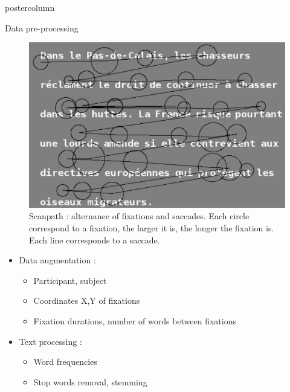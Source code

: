 \documentclass[final,hyperref={pdfpagelabels=false}]{beamer}
\begin{document}
\begin{frame}
\begin{columns}
\begin{column}{.49\textwidth}
\begin{beamercolorbox}[center,wd=\textwidth]{postercolumn}
\begin{minipage}[T]{.95\textwidth}
{\begin{block}{Data pre-processing}
                \begin{minipage}{0.45\textwidth}
                    \begin{figure}[H]
                        \includegraphics[width=1\linewidth]{s4t9bl.png}
                        \caption{Scanpath : alternance of fixations and saccades.
                        Each circle correspond to a fixation, the larger it is, the longer the fixation is.
                        Each line corresponds to a saccade.}
                    \end{figure}
                \end{minipage} \hfill
                \begin{minipage}{0.45\textwidth}
                    \begin{itemize}
                        \item[\bullet] Data augmentation :
                        \begin{itemize}
                            \item[\bullet] Participant, subject
                            \item[\bullet] Coordinates X,Y of fixations
                            \item[\bullet] Fixation durations, number of words between fixations
                        \end{itemize}
                        \item[\bullet] Text processing :
                        \begin{itemize}
                            \item[\bullet] Word frequencies
                            \item[\bullet] Stop words removal, stemming

\end{itemize}
\end{itemize}
\end{minipage}
\end{block}}
\end{minipage}
\end{beamercolorbox}
\end{column}
\end{columns}
\end{frame}
\end{document}
